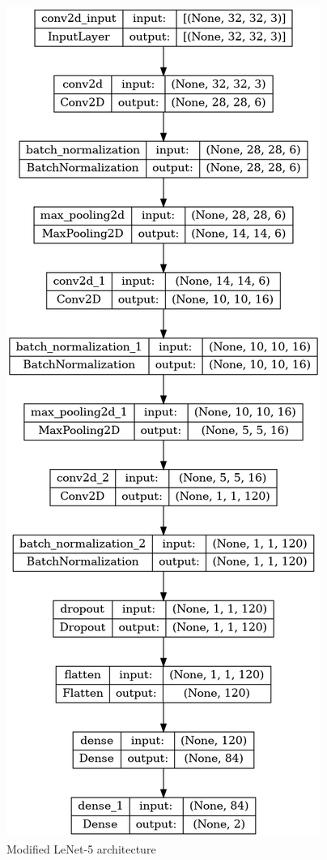 \begin{figure}[h]
    \centering
    \includegraphics[scale=0.4]{mainmatter/images/research methodology/model.png}
    \caption{Modified LeNet-5 architecture}
    \label{fig:lenet5}
\end{figure}

